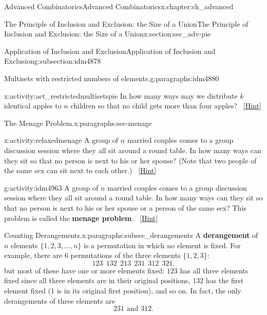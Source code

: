 \documentclass[oneside,10pt,]{book}
\newcommand{\terminology}[1]{\textbf{#1}}
\numberwithin{equation}{chapter}
\begin{document}
\begin{chapterptx}{Advanced Combinatorics}{}{Advanced Combinatorics}{}{}{x:chapter:ch_advanced}
\begin{sectionptx}{The Principle of Inclusion and Exclusion: the Size of a Union}{}{The Principle of Inclusion and Exclusion: the Size of a Union}{}{}{x:section:sec_adv-pie}
\begin{subsectionptx}{Application of Inclusion and Exclusion}{}{Application of Inclusion and Exclusion}{}{}{g:subsection:idm4878}
\begin{paragraphs}{Multisets with restricted numbers of elements.}{g:paragraphs:idm4880}%
\begin{activity}{}{x:activity:act_restrictedmultisetspie}%
In how many ways may we distribute \(k\) identical apples to \(n\) children so that no child gets more than four apples?%
\qquad~\hfill{\tiny\hyperlink{g:hint:idm4887-back}{[Hint]}}\end{activity}
\end{paragraphs}%
\begin{paragraphs}{The Menage Problem.}{x:paragraphs:sec-menage}%
\begin{activity}{}{x:activity:relaxedmenage}%
A group of \(n\) married couples comes to a group discussion session where they all sit around a round table. In how many ways can they sit so that no person is next to his or her spouse? (Note that two people of the same sex can sit next to each other.)%
\qquad~\hfill{\tiny\hyperlink{g:hint:idm4931-back}{[Hint]}}\end{activity}
\begin{activity}{}{g:activity:idm4963}%
A group of \(n\) married couples comes to a group discussion session where they all sit around a round table. In how many ways can they sit so that no person is next to his or her spouse or a person of the same sex? This problem is called the \terminology{menage problem}.%
\qquad~\hfill{\tiny\hyperlink{g:hint:idm4970-back}{[Hint]}}\end{activity}
\end{paragraphs}%
\begin{paragraphs}{Counting Derangements.}{x:paragraphs:subsec_derangements}%
A \terminology{derangement} of \(n\) elements \(\{1,2,3,\ldots, n\}\) is a permutation in which no element is fixed. For example, there are \(6\) permutations of the three elements \(\{1,2,3\}\):%
\begin{equation*}
123 ~~ 132 ~~ 213 ~~ 231 ~~ 312 ~~ 321.
\end{equation*}
but most of these have one or more elements fixed: \(123\) has all three elements fixed since all three elements are in their original positions, \(132\) has the first element fixed (1 is in its original first position), and so on. In fact, the only derangements of three elements are%
\begin{equation*}
231 \text{ and } 312.
\end{equation*}
%
\par

\end{paragraphs}
\end{subsectionptx}
\end{sectionptx}
\end{chapterptx}
\end{document}
